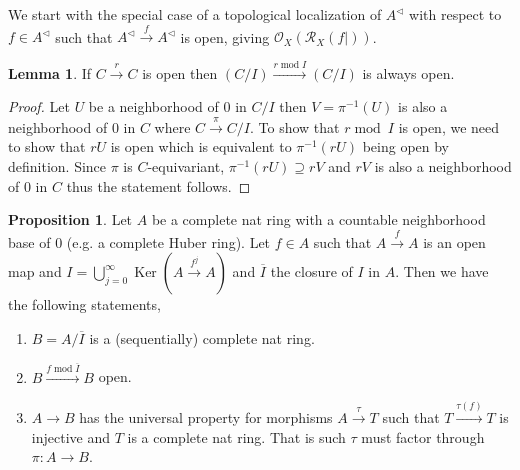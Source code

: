 \documentclass[10pt]{article}
\numberwithin{equation}{section}
\theoremstyle{definition}
\newtheorem{proposition}{Proposition}[subsection]
\newtheorem{lemma}{Lemma}[subsection]
\DeclareMathOperator{\tmod}{mod}
\DeclareMathOperator{\Ker}{Ker}
\newcommand{\Ouv}{\mathscr{O}}
\newcommand{\cR}[0]{\mathcal{R}}
\begin{document}
We start with the special case of a topological localization of $A^\triangleleft$ with respect to $f\in A^\triangleleft$ such that $A^{\triangleleft}\stackrel{f}{\to} A^\triangleleft$ is open, giving $\Ouv_X(\cR_X(f|))$.
\begin{lemma}
    \label{lemma_18_1}
    If $C\stackrel{r}{\to}C$ is open then $(C/I)\stackrel{r\tmod I}{\to}(C/I)$ is always open.
\end{lemma}
\begin{proof}
    Let $U$ be a neighborhood of $0$ in $C/I$ then $V = \pi^{-1}(U)$ is also a neighborhood of $0$ in $C$ where $C\stackrel{\pi}{\to}C/I$. To show that $r\tmod\:I$ is open, we need to show that $rU$ is open which is equivalent to $\pi^{-1}(rU)$ being open by definition.
    Since $\pi$ is $C$-equivariant, $\pi^{-1}(rU)\supseteq rV$ and $rV$ is also a neighborhood of $0$ in $C$ thus the statement follows.
\end{proof}
\begin{proposition}
    \label{proposition_18_1}
    Let $A$ be a complete nat ring with a countable neighborhood base of $0$ (e.g. a complete Huber ring).
    Let $f\in A$ such that $A\stackrel{f}{\to}A$ is an open map and $I=\bigcup_{j=0}^\infty \Ker(A\stackrel{f^j}{\to}A)$ and $\overline{I}$ the closure of $I$ in $A$.
    Then we have the following statements,
    \begin{enumerate}
    \item  $B=A/\overline{I}$ is a (sequentially) complete nat ring.
    \item $B\stackrel{f\tmod \overline{I}}{\to}B$ open.
    \item $A\to B$ has the universal property for morphisms $A\stackrel{\tau}{\to}T$ such that $T\stackrel{\tau(f)}{\to}T$ is injective and $T$ is a complete nat ring. That is such $\tau$ must factor through $\pi:A\to B$.
    \end{enumerate}
\end{proposition}
\end{document}
